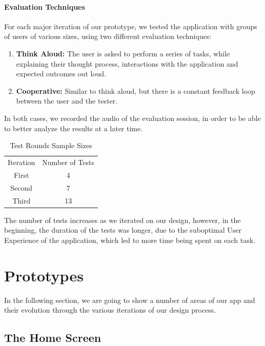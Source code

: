 \documentclass[a4paper, 11pt]{report}
\begin{document}
\paragraph{Evaluation Techniques}
For each major iteration of our prototype, we tested the application with groups of users
of various sizes, using two different evaluation techniques:

\begin{enumerate}
	\item \textbf{Think Aloud:} The user is asked to perform a series of tasks, while explaining their thought process,
	      interactions with the application and expected outcomes out loud.
	\item \textbf{Cooperative:} Similar to think aloud, but there is a constant feedback loop between the user and the tester.
\end{enumerate}

In both cases, we recorded the audio of the evaluation session, in order to be able to better analyze the results
at a later time.

\begin{table}[h!]
	\centering

	\caption{Test Rounds Sample Sizes}\label{tab:participants-table}
	\begin{tabular}{c c}
		\rowcolor{gray!50}
		Iteration & Number of Tests \\
		First     & 4               \\
		Second    & 7               \\
		Third     & 13              \\
	\end{tabular}
\end{table}

The number of tests increases as we iterated on our design, however, in the beginning,
the duration of the tests was longer, due to the suboptimal User Experience of the application,
which led to more time being spent on each task.

\section{Prototypes}\label{sec:prototypes}

In the following section, we are going to show a number of areas of our app and their
evolution through the various iterations of our design process.

\subsection{The Home Screen}\label{ssec:the-home-screen}
\end{document}
